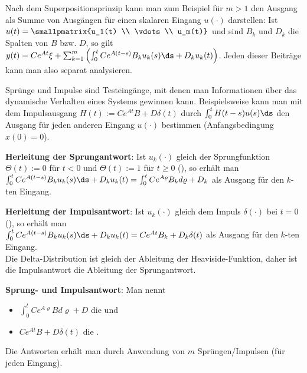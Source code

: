 Nach dem Superpositionsprinzip kann man zum Beispiel für $m > 1$ den Ausgang als Summe
von Ausgängen für einen skalaren Eingang $u(\cdot)$ darstellen:
Ist $u(t) = \smallpmatrix{u_1(t) \\ \vdots \\ u_m(t)}$ und sind $B_k$ und $D_k$ die Spalten
von $B$ bzw. $D$, so gilt
$y(t) = C e^{At} \xi + \sum_{k=1}^m \left(\int_0^t Ce^{A(t-s)} B_k u_k(s)\ds + D_k u_k(t)\right)$.
Jeden dieser Beiträge kann man also separat analysieren.

\linie
\pagebreak

Sprünge und Impulse sind Testeingänge, mit denen man Informationen
über das dynamische Verhalten eines Systems gewinnen kann.
Beispielsweise kann man mit dem Impulsausgang $H(t) := Ce^{At}B + D\delta(t)$
durch $\int_0^t H(t - s) u(s) \ds$ den Ausgang für jeden anderen Eingang
$u(\cdot)$ bestimmen (Anfangsbedingung $x(0) = 0$).

\textbf{Herleitung der Sprungantwort}:
Ist $u_k(\cdot)$ gleich der Sprungfunktion $\Theta(t) := 0$ für $t < 0$ und
$\Theta(t) := 1$ für $t \ge 0$
(), so erhält man\\
$\int_0^t Ce^{A(t-s)} B_k u_k(s)\ds + D_k u_k(t) = \int_0^t Ce^{A\varrho} B_k d\varrho + D_k$
als Ausgang für den $k$-ten Eingang.

\textbf{Herleitung der Impulsantwort}:
Ist $u_k(\cdot)$ gleich dem Impuls $\delta(\cdot)$ bei $t = 0$
(), so erhält man\\
$\int_0^t Ce^{A(t-s)} B_k u_k(s)\ds + D_k u_k(t) = Ce^{At}B_k + D_k \delta(t)$
als Ausgang für den $k$-ten Eingang.\\
Die Delta-Distribution ist gleich der Ableitung der Heaviside-Funktion,
daher ist die Impulsantwort die Ableitung der Sprungantwort.

\textbf{Sprung- und Impulsantwort}:
Man nennt
\begin{itemize}
    \item
    $\int_0^t Ce^{A\varrho}B d\varrho + D$ die  und

    \item
    $C e^{At} B + D \delta(t)$ die .
\end{itemize}
Die Antworten erhält man durch Anwendung von $m$ Sprüngen/Impulsen (für jeden Eingang).

\linie

